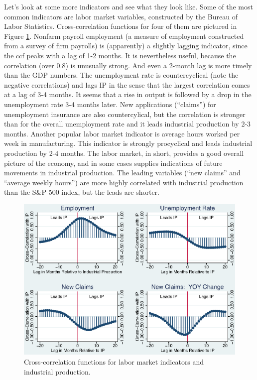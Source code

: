 \documentclass[letterpaper,12pt]{article}
\begin{document}
Let's look at some more indicators and see what they look like.
Some of the most common indicators are labor market variables, 
constructed by the Bureau of Labor Statistics.
Cross-correlation functions for four of them are pictured in 
Figure \ref{fig:ccf-labor}.
Nonfarm payroll employment (a measure of employment constructed 
from a survey of firm payrolls) is (apparently) a slightly
lagging indicator, since the ccf peaks with a lag of 1-2 months.
It is nevertheless useful, because the correlation (over 0.8) is 
unusually strong.
And even a 2-month lag is more timely than the GDP numbers.  
The unemployment rate is countercyclical (note the negative correlations) 
and lags IP in the sense that the largest correlation comes at a 
lag of 3-4 months.  
It seems that a rise in output is followed by a drop 
in the unemployment rate 3-4 months later.  
New applications (``claims'') for unemployment insurance 
are also countercylical, but the correlation is stronger than 
for the overall unemployment rate and it leads industrial 
production by 2-3 months.
Another popular labor market indicator is average hours worked per 
week in manufacturing.  
This indicator is strongly procyclical and leads industrial production
by 2-4 months.  
The labor market, in short, provides a good overall picture of the 
economy, and in some cases supplies 
indications of future movements in industrial production.
The leading variables (``new claims'' and ``average weekly hours'')
are more highly correlated with industrial production
than the S\&P 500 index, but the leads are shorter.  


\begin{figure}
    \centering
    \includegraphics[scale=0.8]{xclabor.eps}
    \caption{Cross-correlation functions for 
    labor market indicators and industrial production.} 
    \label{fig:ccf-labor}%
\end{figure}
\end{document}
